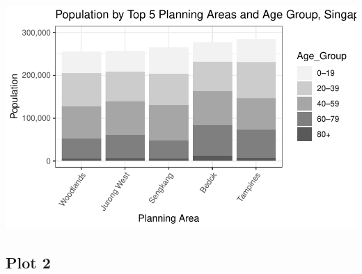 \documentclass[
  letterpaper,
  DIV=11,
  numbers=noendperiod]{scrartcl}
\begin{document}
\includegraphics{Take-home_Ex01_files/figure-pdf/unnamed-chunk-11-1.pdf}

\subsection{Plot 2}\label{plot-2-2}
\end{document}
